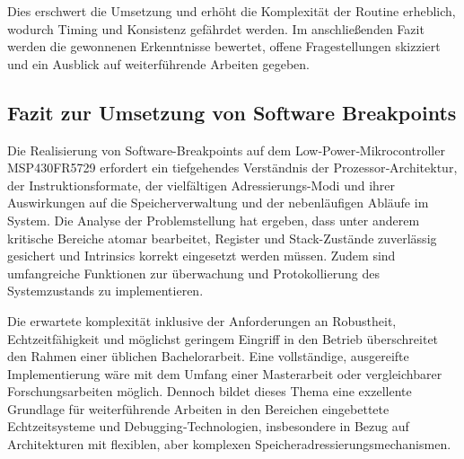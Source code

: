 Dies erschwert die Umsetzung und erh\"oht die Komplexit\"at der Routine erheblich, wodurch Timing und Konsistenz gef\"ahrdet werden. Im anschlie{\ss}enden Fazit werden die gewonnenen Erkenntnisse bewertet, offene Fragestellungen skizziert und ein Ausblick auf weiterf\"uhrende Arbeiten gegeben.

\subsection{Fazit zur Umsetzung von Software Breakpoints}
\label{sec:FazitSoftwareBreakpoints}

Die Realisierung von Software-Breakpoints auf dem Low‑Power‑Mikrocontroller MSP430FR5729 erfordert ein tiefgehendes Verst\"andnis der Prozessor‑Architektur, der Instruktionsformate, der vielf\"altigen Adressierungs-Modi und ihrer Auswirkungen auf die Speicherverwaltung und der nebenl\"aufigen Abl\"aufe im System. Die Analyse der Problemstellung hat ergeben, dass unter anderem kritische Bereiche atomar bearbeitet, Register und Stack-Zust\"ande zuverl\"assig gesichert und Intrinsics korrekt eingesetzt werden m\"ussen. Zudem sind umfangreiche Funktionen zur \"uberwachung und Protokollierung des Systemzustands zu implementieren.

Die erwartete komplexit\"at inklusive der Anforderungen an Robustheit, Echtzeitf\"ahigkeit und m\"oglichst geringem Eingriff in den Betrieb \"uberschreitet den Rahmen einer \"ublichen Bachelorarbeit. Eine vollst\"andige, ausgereifte Implementierung w\"are mit dem Umfang einer Masterarbeit oder vergleichbarer Forschungsarbeiten m\"oglich. Dennoch bildet dieses Thema eine exzellente Grundlage f\"ur weiterf\"uhrende Arbeiten in den Bereichen eingebettete Echtzeitsysteme und Debugging‑Technologien, insbesondere in Bezug auf Architekturen mit flexiblen, aber komplexen Speicheradressierungsmechanismen.

